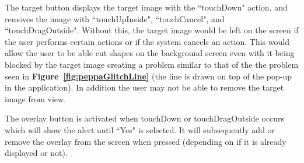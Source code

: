 \documentclass[11pt]{article}
\begin{document}
                    The target button displays the target image with the ``touchDown" action, and removes the image with ``touchUpInside", ``touchCancel", and ``touchDragOutside". Without this, the target image would be left on the screen if the user performs certain actions or if the system cancels an action. This would allow the user to be able cut shapes on the background screen even with it being blocked by the target image creating a problem similar to that of the the problem seen in \textbf{Figure~\ref{fig:peppaGlitchLine}} (the line is drawn on top of the pop-up in the application). In addition the user may not be able to remove the target image from view. 
                    
                    The overlay button is activated when touchDown or touchDragOutside occurs which will show the alert until ``Yes" is selected. It will subsequently add or remove the overlay from the screen when pressed (depending on if it is already displayed or not).
                    
\end{document}
